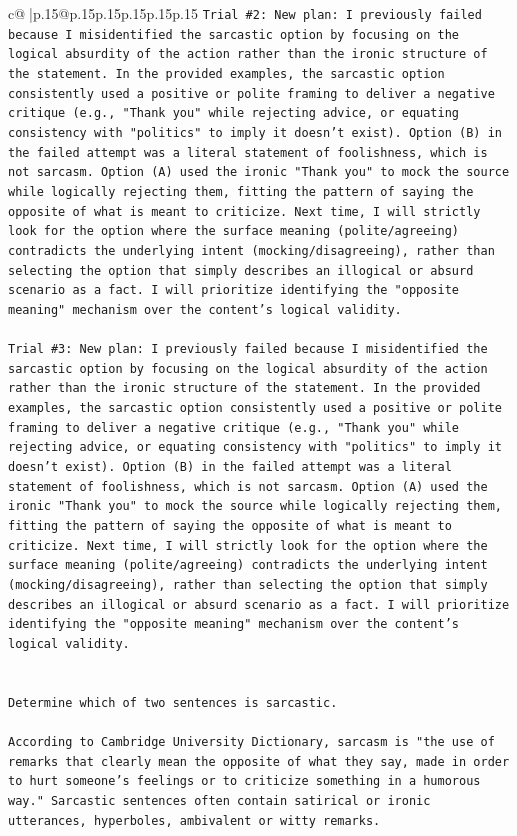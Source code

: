 \documentclass{article}
\begin{document}
{\begin{supertabular}{c@{$\;$}|p{.15\linewidth}@{}p{.15\linewidth}p{.15\linewidth}p{.15\linewidth}p{.15\linewidth}p{.15\linewidth}}
{{{\texttt{Trial \#2: New plan: I previously failed because I misidentified the sarcastic option by focusing on the logical absurdity of the action rather than the ironic structure of the statement. In the provided examples, the sarcastic option consistently used a positive or polite framing to deliver a negative critique (e.g., "Thank you" while rejecting advice, or equating consistency with "politics" to imply it doesn't exist). Option (B) in the failed attempt was a literal statement of foolishness, which is not sarcasm. Option (A) used the ironic "Thank you" to mock the source while logically rejecting them, fitting the pattern of saying the opposite of what is meant to criticize. Next time, I will strictly look for the option where the surface meaning (polite/agreeing) contradicts the underlying intent (mocking/disagreeing), rather than selecting the option that simply describes an illogical or absurd scenario as a fact. I will prioritize identifying the "opposite meaning" mechanism over the content's logical validity.} \\
\\ 
\texttt{Trial \#3: New plan: I previously failed because I misidentified the sarcastic option by focusing on the logical absurdity of the action rather than the ironic structure of the statement. In the provided examples, the sarcastic option consistently used a positive or polite framing to deliver a negative critique (e.g., "Thank you" while rejecting advice, or equating consistency with "politics" to imply it doesn't exist). Option (B) in the failed attempt was a literal statement of foolishness, which is not sarcasm. Option (A) used the ironic "Thank you" to mock the source while logically rejecting them, fitting the pattern of saying the opposite of what is meant to criticize. Next time, I will strictly look for the option where the surface meaning (polite/agreeing) contradicts the underlying intent (mocking/disagreeing), rather than selecting the option that simply describes an illogical or absurd scenario as a fact. I will prioritize identifying the "opposite meaning" mechanism over the content's logical validity.} \\
\\ 
\\ 
\texttt{Determine which of two sentences is sarcastic.} \\
\\ 
\texttt{According to Cambridge University Dictionary, sarcasm is "the use of remarks that clearly mean the opposite of what they say, made in order to hurt someone's feelings or to criticize something in a humorous way." Sarcastic sentences often contain satirical or ironic utterances, hyperboles, ambivalent or witty remarks.} \\
}}}
\end{supertabular}}
\end{document}
